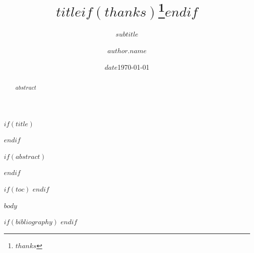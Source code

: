 \documentclass[11pt, a4paper, bibliography=totoc, parskip=full]{scrartcl}
\title{$title$$if(thanks)$\thanks{$thanks$}$endif$}
\subtitle{$subtitle$}
\author{$author.name$}
\date{$date$}
\date{\today}
\begin{document}
$if(title)$
\maketitle
$endif$

$if(abstract)$
\begin{abstract}
    $abstract$
\end{abstract}
$endif$

$if(toc)$
\tableofcontents
$endif$

$body$

$if(bibliography)$
\printbibliography[title=Bibliography]
$endif$
\end{document}
